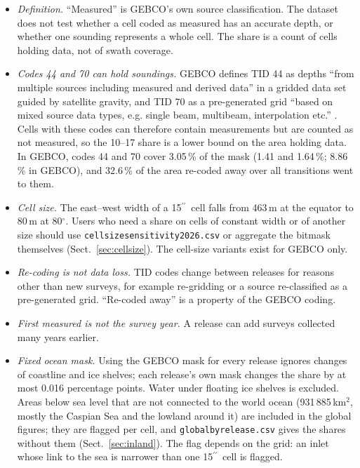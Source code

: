 \documentclass[essd, manuscript]{copernicus}
\newcommand{\as}{$^{\prime\prime}$}      %
\renewcommand{\_}{\usorig\allowbreak}
\begin{document}
\begin{itemize}
\item \textit{Definition.} ``Measured'' is GEBCO's own source classification. The dataset does not test whether a cell coded as measured has an accurate depth, or whether one sounding represents a whole cell. The share is a count of cells holding data, not of swath coverage.
\item \textit{Codes 44 and 70 can hold soundings.} GEBCO defines TID 44 as depths ``from multiple sources including measured and derived data'' in a gridded data set guided by satellite gravity, and TID 70 as a pre-generated grid ``based on mixed source data types, e.g. single beam, multibeam, interpolation etc.'' \citep{gebcodoc2026}. Cells with these codes can therefore contain measurements but are counted as not measured, so the 10--17 share is a lower bound on the area holding data. In GEBCO\_2026, codes 44 and 70 cover 3.05\,\% of the mask (1.41 and 1.64\,\%; 8.86\,\% in GEBCO\_2019), and 32.6\,\% of the area re-coded away over all transitions went to them.
\item \textit{Cell size.} The east--west width of a 15\as\ cell falls from 463\,m at the equator to 80\,m at 80$^\circ$. Users who need a share on cells of constant width or of another size should use \texttt{cellsize\_sensitivity\_2026.csv} or aggregate the bitmask themselves (Sect.~\ref{sec:cellsize}). The cell-size variants exist for GEBCO\_2026 only.
\item \textit{Re-coding is not data loss.} TID codes change between releases for reasons other than new surveys, for example re-gridding or a source re-classified as a pre-generated grid. ``Re-coded away'' is a property of the GEBCO coding.
\item \textit{First measured is not the survey year.} A release can add surveys collected many years earlier.
\item \textit{Fixed ocean mask.} Using the GEBCO\_2026 mask for every release ignores changes of coastline and ice shelves; each release's own mask changes the share by at most 0.016 percentage points. Water under floating ice shelves is excluded. Areas below sea level that are not connected to the world ocean (931\,885\,km$^2$, mostly the Caspian Sea and the lowland around it) are included in the global figures; they are flagged per cell, and \texttt{global\_by\_release.csv} gives the shares without them (Sect.~\ref{sec:inland}). The flag depends on the grid: an inlet whose link to the sea is narrower than one 15\as\ cell is flagged.

\end{itemize}
\end{document}
